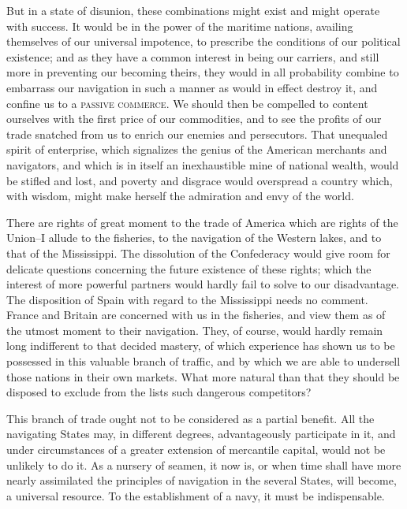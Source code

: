 But in a state of disunion, these combinations might exist and might operate with success. It would be in the power of the maritime nations, availing themselves of our universal impotence, to prescribe the conditions of our political existence; and as they have a common interest in being our carriers, and still more in preventing our becoming theirs, they would in all probability combine to embarrass our navigation in such a manner as would in effect destroy it, and confine us to a \textsc{passive commerce}. We should then be compelled to content ourselves with the first price of our commodities, and to see the profits of our trade snatched from us to enrich our enemies and persecutors. That unequaled spirit of enterprise, which signalizes the genius of the American merchants and navigators, and which is in itself an inexhaustible mine of national wealth, would be stifled and lost, and poverty and disgrace would overspread a country which, with wisdom, might make herself the admiration and envy of the world.

There are rights of great moment to the trade of America which are rights of the Union--I allude to the fisheries, to the navigation of the Western lakes, and to that of the Mississippi. The dissolution of the Confederacy would give room for delicate questions concerning the future existence of these rights; which the interest of more powerful partners would hardly fail to solve to our disadvantage. The disposition of Spain with regard to the Mississippi needs no comment. France and Britain are concerned with us in the fisheries, and view them as of the utmost moment to their navigation. They, of course, would hardly remain long indifferent to that decided mastery, of which experience has shown us to be possessed in this valuable branch of traffic, and by which we are able to undersell those nations in their own markets. What more natural than that they should be disposed to exclude from the lists such dangerous competitors?

This branch of trade ought not to be considered as a partial benefit. All the navigating States may, in different degrees, advantageously participate in it, and under circumstances of a greater extension of mercantile capital, would not be unlikely to do it. As a nursery of seamen, it now is, or when time shall have more nearly assimilated the principles of navigation in the several States, will become, a universal resource. To the establishment of a navy, it must be indispensable.

